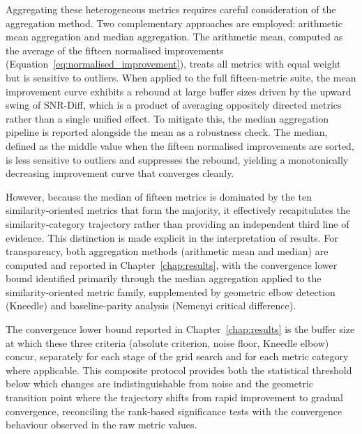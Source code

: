 \documentclass[MScCS,12pt,oneside,final]{uccthesis}
\begin{document}
Aggregating these heterogeneous metrics requires careful consideration of the aggregation method. Two complementary approaches are employed: arithmetic mean aggregation and median aggregation. The arithmetic mean, computed as the average of the fifteen normalised improvements (Equation~\ref{eq:normalised_improvement}), treats all metrics with equal weight but is sensitive to outliers. When applied to the full fifteen-metric suite, the mean improvement curve exhibits a rebound at large buffer sizes driven by the upward swing of SNR-Diff, which is a product of averaging oppositely directed metrics rather than a single unified effect. To mitigate this, the median aggregation pipeline is reported alongside the mean as a robustness check. The median, defined as the middle value when the fifteen normalised improvements are sorted, is less sensitive to outliers and suppresses the rebound, yielding a monotonically decreasing improvement curve that converges cleanly.

However, because the median of fifteen metrics is dominated by the ten similarity-oriented metrics that form the majority, it effectively recapitulates the similarity-category trajectory rather than providing an independent third line of evidence. This distinction is made explicit in the interpretation of results. For transparency, both aggregation methods (arithmetic mean and median) are computed and reported in Chapter~\ref{chap:results}, with the convergence lower bound identified primarily through the median aggregation applied to the similarity-oriented metric family, supplemented by geometric elbow detection (Kneedle) and baseline-parity analysis (Nemenyi critical difference).

The convergence lower bound reported in Chapter~\ref{chap:results} is the buffer size at which these three criteria (absolute criterion, noise floor, Kneedle elbow) concur, separately for each stage of the grid search and for each metric category where applicable. This composite protocol provides both the statistical threshold below which changes are indistinguishable from noise and the geometric transition point where the trajectory shifts from rapid improvement to gradual convergence, reconciling the rank-based significance tests with the convergence behaviour observed in the raw metric values.
\end{document}

